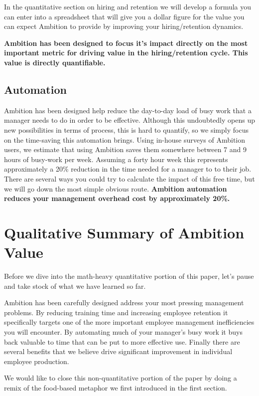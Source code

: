 \documentclass[paper=a4, fontsize=11pt abstract]{scrartcl}
\numberwithin{equation}{section}		%
\numberwithin{figure}{section}			%
\numberwithin{table}{section}				%
\begin{document}
In the quantitative section on hiring and retention we will develop a formula you can enter into a spreadsheet that will give you a dollar figure for the value you can expect Ambition to provide by improving your hiring/retention dynamics.

\textbf{Ambition has been designed to focus it's impact directly on the most important metric for driving value in the hiring/retention cycle. This value is directly quantifiable.} 


\subsection{Automation}
Ambition has been designed help reduce the day-to-day load of busy work that a manager needs to do in order to be effective.  Although this undoubtedly opens up new possibilities in terms of process, this is hard to quantify, so we simply focus on the time-saving this automation brings.  Using in-house surveys of Ambition users, we estimate that using Ambition saves them somewhere between 7 and 9 hours of busy-work per week.  Assuming a forty hour week this represents approximately a 20\% reduction in the time needed for a manager to to their job.  There are several ways you could try to calculate the impact of this free time, but we will go down the most simple obvious route.  \textbf{Ambition automation reduces your management overhead cost by approximately 20\%.}

\section{Qualitative Summary of Ambition Value}
Before we dive into the math-heavy quantitative portion of this paper, let's pause and take stock of what we have learned so far.

Ambition has been carefully designed address your most pressing management problems.  By reducing training time and increasing employee retention it specifically targets one of the more important employee management inefficiencies you will encounter.  By automating much of your manager's busy work it buys back valuable to time that can be put to more effective use.  Finally there are several benefits that we believe drive significant improvement in individual employee production.

We would like to close this non-quantitative portion of the paper by doing a remix of the food-based metaphor we first introduced in the first section.
\end{document}
